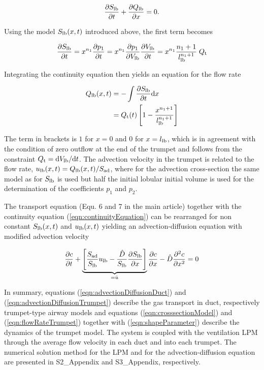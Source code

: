 \begin{equation} \label{eqn:continuityEquation}
\frac{\partial S_{\mathrm{lb}}}{\partial t} + \frac{\partial Q_{\mathrm{lb}}}{\partial x} = 0 \text{.}
\end{equation}

Using the model $S_{\mathrm{lb}}(x,t)$ introduced above, the first term becomes

\begin{equation}
  \frac{\partial S_{\mathrm{lb}}}{\partial t} = x^{n_1}\frac{\partial p_1}{\partial t} = x^{n_1}\frac{\partial p_1}{\partial V_{\mathrm{lb}}}\frac{\partial V_{\mathrm{lb}}}{\partial t} = x^{n_1} \frac{n_1+1}{l_{\mathrm{lb}}^{n_1+1}}\;Q_{\mathrm{t}}
\end{equation}

Integrating the continuity equation then yields an equation for the flow rate

\begin{equation} \label{eqn:flowRateTrumpet}
\begin{split}
Q_{\mathrm{lb}}(x,t) &= -\int \frac{\partial S_{\mathrm{lb}}}{\partial t} \mathrm{d} x \\
       &= Q_{\mathrm{t}}(t)\left[1 - \frac{x^{n_1+1}}{l_{\mathrm{lb}}^{n_1+1}}\right]
\end{split}
\end{equation}

The term in brackets is $1$ for $x=0$ and $0$ for $x = l_{\mathrm{lb}}$, which is in agreement with the condition of zero outflow at the end of the trumpet and follows from the constraint $Q_{\mathrm{t}} = \mathrm{d} V_{\mathrm{lb}} / \mathrm{d} t$.
The advection velocity in the trumpet is related to the flow rate, $u_{\mathrm{lb}}(x,t) = Q_{\mathrm{lb}}(x,t)/S_\mathrm{ad}$, where for the advection cross-section the same model as for $S_{\mathrm{lb}}$ is used but half the initial lobular initial volume is used for the determination of the coefficients $p_1$ and $p_2$.

The transport equation (Equ. 6 and 7 in the main article) together with the continuity equation (\ref{eqn:continuityEquation}) can be rearranged for non constant $S_{\mathrm{lb}}(x,t)$ and $u_{\mathrm{lb}}(x,t)$ yielding an advection-diffusion equation with modified advection velocity

\begin{equation} \label{eqn:advectionDiffusionTrumpet}
\frac{\partial c}{\partial t} + \underbrace{\left[\frac{S_\mathrm{ad}}{S_{\mathrm{lb}}}u_{\mathrm{lb}} - \frac{\hat{D}}{S_{\mathrm{lb}}}\frac{\partial S_{\mathrm{lb}}}{\partial x} \right]}_{=\hat{u}}\frac{\partial c}{\partial x} - \hat{D}\frac{\partial^2 c}{\partial x^2} = 0
\end{equation}

In summary, equations (\ref{eqn:advectionDiffusionDuct}) and (\ref{eqn:advectionDiffusionTrumpet}) describe the gas transport in duct,
respectively trumpet-type airway models and equations (\ref{eqn:crosssectionModel}) and (\ref{eqn:flowRateTrumpet}) together with (\ref{eqn:shapeParameter}) describe the dynamics of the trumpet model.
The system is coupled with the ventilation LPM through the average flow velocity in each duct and into each trumpet.
The numerical solution method for the LPM and for the advection-diffusion equation are presented in S2\_Appendix and S3\_Appendix, respectively.



